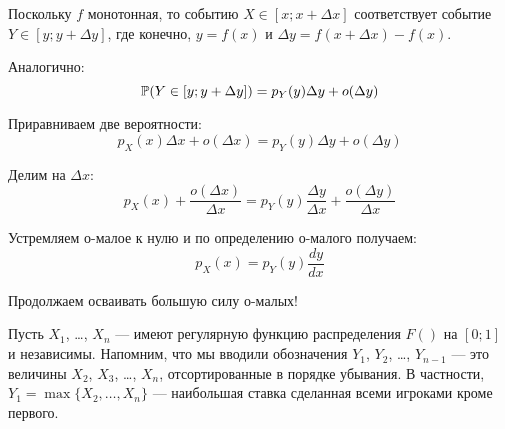 Поскольку $ f $ монотонная, то событию $X\in [x;x+\Delta x]  $ соответствует событие $Y\in [y;y+\Delta y]$, где конечно, $ y=f(x) $ и $ \Delta y= f(x+\Delta x)-f(x) $.

Аналогично:
\begin{equation}
\P(Y\in [y;y+\Delta y])=p_{Y}(y)\Delta y+o(\Delta y)
\end{equation}

Приравниваем две вероятности:
\begin{equation}
p_{X}(x)\Delta x+o(\Delta x)=p_{Y}(y)\Delta y+o(\Delta y)
\end{equation}

Делим на $ \Delta x $:
\begin{equation}
p_{X}(x)+\frac{o(\Delta x)}{\Delta x}=p_{Y}(y)\frac{\Delta y}{\Delta x}+\frac{o(\Delta y)}{\Delta x}
\end{equation}

Устремляем о-малое к нулю и по определению о-малого получаем:
\begin{equation}
p_{X}(x)=p_{Y}(y)\frac{dy}{dx}
\end{equation}

Продолжаем осваивать большую силу о-малых!

Пусть $ X_{1} $, \ldots, $ X_{n} $ — имеют регулярную функцию распределения $ F() $ на $ [0;1] $ и независимы. Напомним, что мы вводили обозначения $ Y_{1} $, $ Y_{2} $, \ldots, $ Y_{n-1} $ — это величины $ X_{2} $, $ X_{3} $, \ldots, $ X_{n} $, отсортированные в порядке убывания. В частности, $ Y_{1}=\max\{X_{2},\ldots,X_{n}\} $ — наибольшая ставка сделанная всеми игроками кроме первого.


